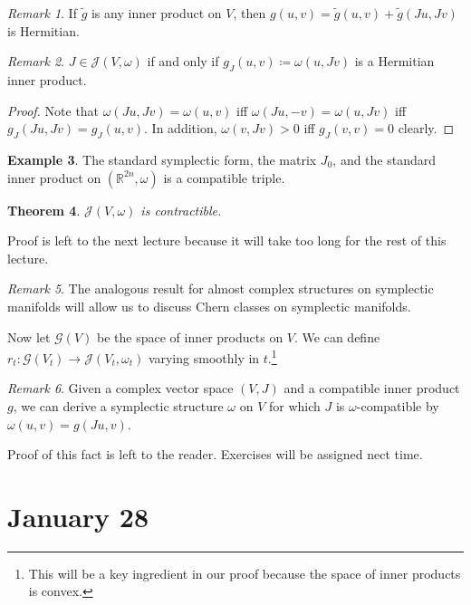 \documentclass[leqno, openany]{memoir}
\newtheorem{thm}{Theorem}[chapter]
\theoremstyle{definition}
\newtheorem{exm}[thm]{Example}
\theoremstyle{remark}
\newtheorem{rmk}[thm]{Remark}
\theoremstyle{plain}
\theoremstyle{definition}
\theoremstyle{remark}
\newcommand{\R}{\mathbb{R}}
\newcommand{\mc}[1]{\mathcal{#1}}
\begin{document}
\begin{rmk}
    If $\widetilde{g}$ is any inner product on $V$, then $g(u,v) = \widetilde{g}(u,v) + \widetilde{g}(Ju,Jv)$ is Hermitian.
\end{rmk}

\begin{rmk}
    $J \in \mc{J}(V, \omega)$ if and only if $g_J(u,v) \coloneqq \omega(u, Jv)$ is a Hermitian inner product.
\end{rmk}

\begin{proof}
    Note that $\omega(Ju, Jv) = \omega(u,v)$ iff $\omega(Ju, -v) = \omega(u, Jv)$ iff $g_J(Ju, Jv) = g_J(u,v)$. In addition, $\omega(v, Jv) > 0$ iff $g_J(v,v) = 0$ clearly.
\end{proof}

\begin{exm}
    The standard symplectic form, the matrix $J_0$, and the standard inner product on $(\R^{2n}, \omega)$ is a compatible triple.
\end{exm}

\begin{thm}
    $\mc{J}(V, \omega)$ is contractible.
\end{thm}
Proof is left to the next lecture because it will take too long for the rest of this lecture.

\begin{rmk}
    The analogous result for almost complex structures on symplectic manifolds will allow us to discuss Chern classes on symplectic manifolds.
\end{rmk}

Now let $\mc{G}(V)$ be the space of inner products on $V$. We can define $r_t: \mc{G}(V_t) \to \mc{J}(V_t, \omega_t)$ varying smoothly in $t$.\footnote{This will be a key ingredient in our proof because the space of inner products is convex.}

\begin{rmk}
    Given a complex vector space $(V, J)$ and a compatible inner product $g$, we can derive a symplectic structure $\omega$ on $V$ for which $J$ is $\omega$-compatible by $\omega(u,v) = g(Ju, v)$.
\end{rmk}
Proof of this fact is left to the reader. Exercises will be assigned nect time.

\chapter{January 28}%
\label{cha:january_28}
\end{document}
